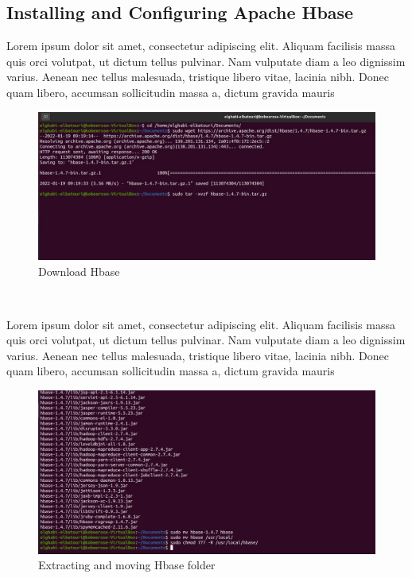 \begin{spacing}{1.2}
\section{Installing and Configuring Apache Hbase }
\par Lorem ipsum dolor sit amet, consectetur adipiscing elit. Aliquam facilisis massa quis orci volutpat, ut dictum tellus pulvinar. Nam vulputate diam a leo dignissim varius. Aenean nec tellus malesuada, tristique libero vitae, lacinia nibh. Donec quam libero, accumsan sollicitudin massa a, dictum gravida mauris
\\
\begin{figure}[!htb] 
\begin{center} 
\includegraphics[width=1\linewidth]{Pictures/HBase/Configuring Hbase in Standalone & Pseudo-distributed mode/Installing and Configuring Apache Hbase/Download Hbase} 
\end{center} 
\caption{Download Hbase} 
\end{figure}  \FloatBarrier
\\

\par Lorem ipsum dolor sit amet, consectetur adipiscing elit. Aliquam facilisis massa quis orci volutpat, ut dictum tellus pulvinar. Nam vulputate diam a leo dignissim varius. Aenean nec tellus malesuada, tristique libero vitae, lacinia nibh. Donec quam libero, accumsan sollicitudin massa a, dictum gravida mauris
\\
\begin{figure}[!htb] 
\begin{center} 
\includegraphics[width=1\linewidth]{Pictures/HBase/Configuring Hbase in Standalone & Pseudo-distributed mode/Installing and Configuring Apache Hbase/Extracting and moving Hbase folder} 
\end{center} 
\caption{Extracting and moving Hbase folder} 
\end{figure}  \FloatBarrier
\\


\end{spacing}
